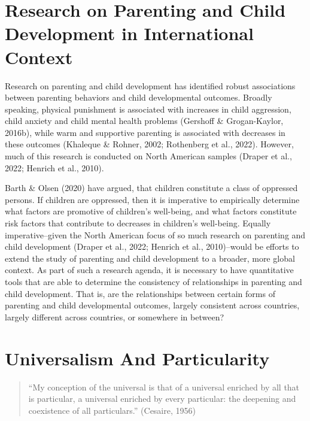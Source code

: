\documentclass[
  letterpaper,
  DIV=11,
  numbers=noendperiod]{scrreprt}
\begin{document}
\section{Research on Parenting and Child Development in International
Context}\label{research-on-parenting-and-child-development-in-international-context}

Research on parenting and child development has identified robust
associations between parenting behaviors and child developmental
outcomes. Broadly speaking, physical punishment is associated with
increases in child aggression, child anxiety and child mental health
problems (Gershoff \& Grogan-Kaylor, 2016b), while warm and supportive
parenting is associated with decreases in these outcomes (Khaleque \&
Rohner, 2002; Rothenberg et al., 2022). However, much of this research
is conducted on North American samples (Draper et al., 2022; Henrich et
al., 2010).

Barth \& Olsen (2020) have argued, that children constitute a class of
oppressed persons. If children are oppressed, then it is imperative to
empirically determine what factors are promotive of children's
well-being, and what factors constitute risk factors that contribute to
decreases in children's well-being. Equally imperative--given the North
American focus of so much research on parenting and child development
(Draper et al., 2022; Henrich et al., 2010)--would be efforts to extend
the study of parenting and child development to a broader, more global
context. As part of such a research agenda, it is necessary to have
quantitative tools that are able to determine the consistency of
relationships in parenting and child development. That is, are the
relationships between certain forms of parenting and child developmental
outcomes, largely consistent across countries, largely different across
countries, or somewhere in between?

\section{Universalism And
Particularity}\label{universalism-and-particularity}

\begin{quote}
``My conception of the universal is that of a universal enriched by all
that is particular, a universal enriched by every particular: the
deepening and coexistence of all particulars.'' (Cesaire, 1956)
\end{quote}
\end{document}
